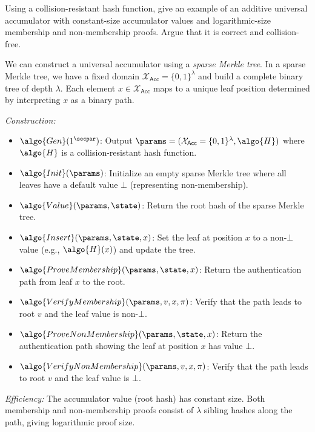 \begin{exercise}[Optional]
  Using a collision-resistant hash function, give an example of an additive universal accumulator with constant-size accumulator values and logarithmic-size membership and non-membership proofs.
  Argue that it is correct and collision-free.
\end{exercise}

\ifsolutions
\begin{mysolution}
  We can construct a universal accumulator using a \emph{sparse Merkle tree}.
  In a sparse Merkle tree, we have a fixed domain $\mathcal{X}_\mathsf{Acc} = \{0,1\}^\lambda$ and build a complete binary tree of depth $\lambda$.
  Each element $x \in \mathcal{X}_\mathsf{Acc}$ maps to a unique leaf position determined by interpreting $x$ as a binary path.
  
  \emph{Construction:}
  \begin{itemize}
    \item $\algo{Gen}(1^\secpar)$: Output $\params = (\mathcal{X}_\mathsf{Acc} = \{0,1\}^\lambda, \algo{H})$ where $\algo{H}$ is a collision-resistant hash function.
    \item $\algo{Init}(\params)$: Initialize an empty sparse Merkle tree where all leaves have a default value $\bot$ (representing non-membership).
    \item $\algo{Value}(\params, \state)$: Return the root hash of the sparse Merkle tree.
    \item $\algo{Insert}(\params, \state, x)$: Set the leaf at position $x$ to a non-$\bot$ value (e.g., $\algo{H}(x)$) and update the tree.
    \item $\algo{ProveMembership}(\params, \state, x)$: Return the authentication path from leaf $x$ to the root.
    \item $\algo{VerifyMembership}(\params, v, x, \pi)$: Verify that the path leads to root $v$ and the leaf value is non-$\bot$.
    \item $\algo{ProveNonMembership}(\params, \state, x)$: Return the authentication path showing the leaf at position $x$ has value $\bot$.
    \item $\algo{VerifyNonMembership}(\params, v, x, \pi)$: Verify that the path leads to root $v$ and the leaf value is $\bot$.
  \end{itemize}
  
  \emph{Efficiency:} The accumulator value (root hash) has constant size.
  Both membership and non-membership proofs consist of $\lambda$ sibling hashes along the path, giving logarithmic proof size.
  

\end{mysolution}
